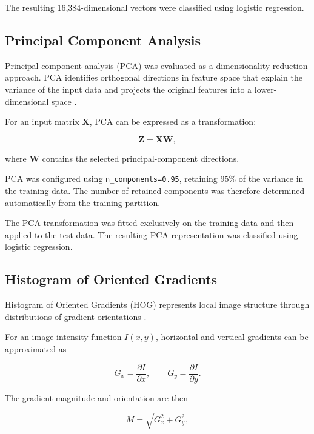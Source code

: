 \documentclass[11pt,a4paper]{article}
\begin{document}
The resulting 16,384-dimensional vectors were classified using logistic regression.

\subsection{Principal Component Analysis}

Principal component analysis (PCA) was evaluated as a dimensionality-reduction approach. PCA identifies orthogonal directions in feature space that explain the variance of the input data and projects the original features into a lower-dimensional space \cite{jolliffe2002principal}.

For an input matrix $\mathbf{X}$, PCA can be expressed as a transformation:

\begin{equation}
\mathbf{Z} = \mathbf{X}\mathbf{W},
\end{equation}

where $\mathbf{W}$ contains the selected principal-component directions.

PCA was configured using \texttt{n\_components=0.95}, retaining 95\% of the variance in the training data. The number of retained components was therefore determined automatically from the training partition.

The PCA transformation was fitted exclusively on the training data and then applied to the test data. The resulting PCA representation was classified using logistic regression.

\subsection{Histogram of Oriented Gradients}

Histogram of Oriented Gradients (HOG) represents local image structure through distributions of gradient orientations \cite{dalal2005histograms}.

For an image intensity function $I(x,y)$, horizontal and vertical gradients can be approximated as

\begin{equation}
G_x = \frac{\partial I}{\partial x},
\qquad
G_y = \frac{\partial I}{\partial y}.
\end{equation}

The gradient magnitude and orientation are then

\begin{equation}
M = \sqrt{G_x^2 + G_y^2},
\end{equation}
\end{document}
